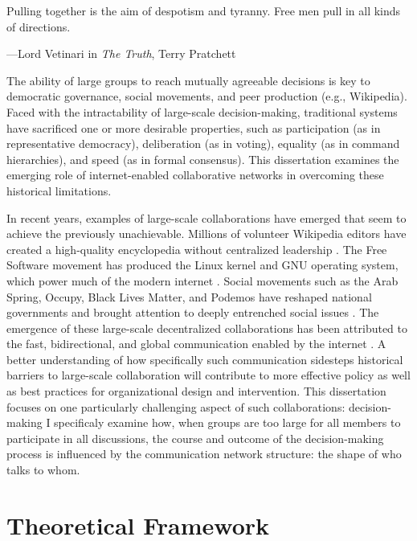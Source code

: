 \epigraph
{Pulling together is the aim of despotism and tyranny. Free men pull in all kinds of directions.}
{---Lord Vetinari in {\em The Truth}, Terry Pratchett}

The ability of large groups to reach mutually agreeable decisions is key to
democratic governance, social movements, and peer production (e.g., Wikipedia).
Faced with the intractability of large-scale decision-making, traditional
systems have sacrificed one or more desirable properties, such as participation
(as in representative democracy), deliberation (as in voting), equality
(as in command hierarchies), and speed (as in formal consensus).
This dissertation examines the emerging role of internet-enabled collaborative
networks in overcoming these historical limitations.

In recent years, examples of large-scale collaborations have emerged that seem
to achieve the previously unachievable. Millions of volunteer Wikipedia editors
have created a high-quality encyclopedia without centralized leadership
\cite{keegan_evolution_2017, giles_internet_2005}.
The Free Software movement has produced the Linux kernel and GNU operating
system, which power much of the modern internet
\cite{coleman_coding_2012, benkler_coases_2002, raymond_cathedral_1999}.
Social movements such as the Arab Spring, Occupy, Black Lives Matter, and
Podemos have reshaped national governments and brought attention to deeply
entrenched social issues
\cite{tufekci_twitter_2017, gonzalez-bailon_networked_2016}.
The emergence of these large-scale decentralized collaborations has been
attributed to the fast, bidirectional,
and global communication enabled by the internet
\cite{tufekci_twitter_2017, benkler_coases_2002}.
A better understanding of how specifically such communication sidesteps
historical barriers to large-scale collaboration will contribute to more
effective policy as well as best practices for organizational design and
intervention.
This dissertation focuses on one particularly challenging aspect of
such collaborations: decision-making
I specificaly examine how,
when groups are too large for all members to participate in all discussions,
the course and outcome of the decision-making process is influenced by the
communication network structure: the shape of who talks to whom.

\section{Theoretical Framework}

